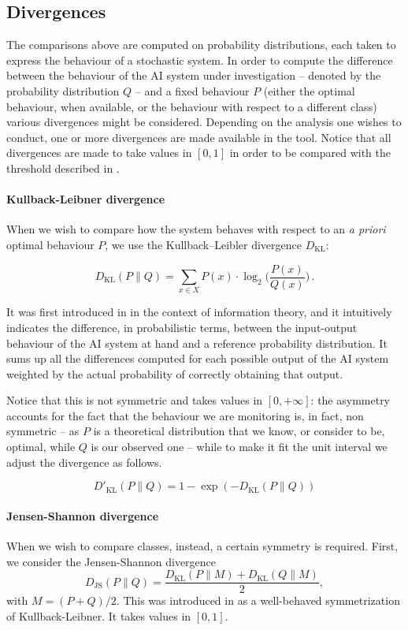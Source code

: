 \documentclass[
]{ceurart}
\begin{document}
\subsection{Divergences}
The comparisons above are computed on probability distributions, each taken to express the behaviour of a stochastic system. In order to compute the difference between the behaviour of the AI system under investigation -- denoted by the probability distribution $Q$ -- and a fixed behaviour $P$ (either the optimal behaviour, when available, or the behaviour with respect to a different class) various divergences might be considered. Depending on the analysis one wishes to conduct, one or more divergences are made available in the tool. Notice that all divergences are made to take values in $[0,1]$ in order to be compared with the threshold described in .


\paragraph{Kullback-Leibner divergence}
When we wish to compare how the system behaves with respect to an \textit{a priori} optimal behaviour $P$, we use the Kullback–Leibler divergence $D_{\mathrm{KL}}$:

\[D_{\mathrm{KL}}(P\parallel Q)= \sum _{x\in X} P(x)\cdot \log_2 \Big( \frac{P(x)}{Q(x)}\Big)\,.\]

It was first introduced in \cite{dkl} in the context of information theory, and it intuitively indicates the difference, in probabilistic terms, between the input-output behaviour of the AI system at hand and a reference probability distribution. It sums up all the differences computed for each possible output of the AI system weighted by the actual probability of correctly obtaining that output.

Notice that this is not symmetric and takes values in $[0,+\infty]$: the asymmetry accounts for the fact that the behaviour we are monitoring is, in fact, non symmetric -- as $P$ is a theoretical distribution that we know, or consider to be, optimal, while $Q$ is our observed one -- while to make it fit the unit interval we adjust the divergence as follows.

\[D'_{\mathrm{KL}}(P\parallel Q)=1-\exp (- D_{\mathrm{KL}}(P\parallel Q))\]

\paragraph{Jensen-Shannon divergence}
When we wish to compare classes, instead, a certain symmetry is required. First, we consider the Jensen-Shannon divergence 
\[D_{\mathrm{JS}}(P\parallel Q)=\frac{D_{\mathrm{KL}}(P\parallel M)+D_{\mathrm{KL}}(Q\parallel M)}{2},\]
with $M=(P+Q)/2$. This was introduced in \cite{lin_divergence} as a well-behaved symmetrization of Kullback-Leibner. It takes values in $[0,1]$.
\end{document}
